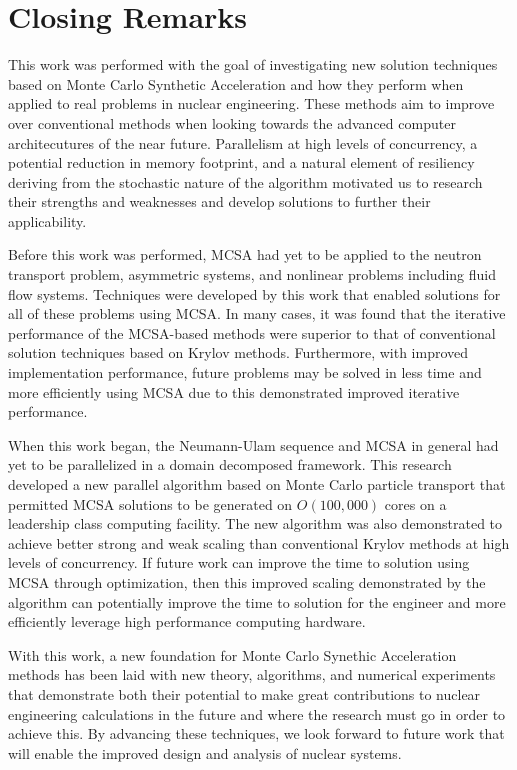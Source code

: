 \section{Closing Remarks\ }
\label{sec:closing}

This work was performed with the goal of investigating new solution
techniques based on Monte Carlo Synthetic Acceleration and how they
perform when applied to real problems in nuclear engineering. These
methods aim to improve over conventional methods when looking towards
the advanced computer architecutures of the near future. Parallelism
at high levels of concurrency, a potential reduction in memory
footprint, and a natural element of resiliency deriving from the
stochastic nature of the algorithm motivated us to research their
strengths and weaknesses and develop solutions to further their
applicability. 

Before this work was performed, MCSA had yet to be applied to the
neutron transport problem, asymmetric systems, and nonlinear problems
including fluid flow systems. Techniques were developed by this work
that enabled solutions for all of these problems using MCSA. In many
cases, it was found that the iterative performance of the MCSA-based
methods were superior to that of conventional solution techniques
based on Krylov methods. Furthermore, with improved implementation
performance, future problems may be solved in less time and more
efficiently using MCSA due to this demonstrated improved iterative
performance. 

When this work began, the Neumann-Ulam sequence and MCSA in general
had yet to be parallelized in a domain decomposed framework. This
research developed a new parallel algorithm based on Monte Carlo
particle transport that permitted MCSA solutions to be generated on
$O(100,000)$ cores on a leadership class computing facility. The new
algorithm was also demonstrated to achieve better strong and weak
scaling than conventional Krylov methods at high levels of
concurrency. If future work can improve the time to solution using
MCSA through optimization, then this improved scaling demonstrated by
the algorithm can potentially improve the time to solution for the
engineer and more efficiently leverage high performance computing
hardware.

With this work, a new foundation for Monte Carlo Synethic Acceleration
methods has been laid with new theory, algorithms, and numerical
experiments that demonstrate both their potential to make great
contributions to nuclear engineering calculations in the future and
where the research must go in order to achieve this. By advancing
these techniques, we look forward to future work that will enable the
improved design and analysis of nuclear systems.
